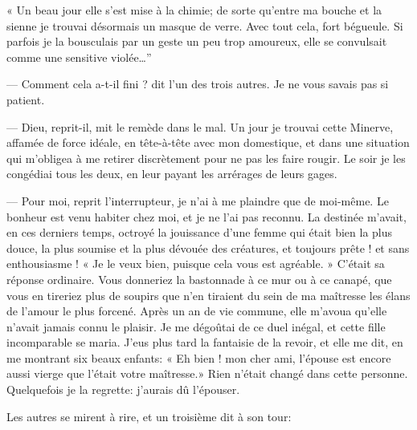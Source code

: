 « Un beau jour elle s’est mise à la chimie; de sorte
qu’entre ma bouche et la sienne je trouvai désormais
un masque de verre. Avec tout cela, fort bégueule. Si parfois je la
bousculais par un geste un peu trop amoureux, elle se convulsait comme
une sensitive violée\ldots''

--- Comment cela a{}-t{}-il fini ? dit l’un des trois
autres. Je ne vous savais pas si patient.

--- Dieu, reprit{}-il, mit le remède dans le mal. Un jour je trouvai cette
Minerve, affamée de force idéale, en tête{}-à{}-tête avec mon
domestique, et dans une situation qui m’obligea à me
retirer discrètement pour ne pas les faire rougir. Le soir je les
congédiai tous les deux, en leur payant les arrérages de leurs gages.

--- Pour moi, reprit l’interrupteur, je
n’ai à me plaindre que de moi{}-même. Le bonheur est
venu habiter chez moi, et je ne l’ai pas reconnu. La
destinée m’avait, en ces derniers temps, octroyé la
jouissance d’une femme qui était bien la plus douce,
la plus soumise et la plus dévouée des créatures, et toujours prête !
et sans enthousiasme ! « Je le veux bien, puisque cela vous est
agréable. » C’était sa réponse ordinaire. Vous
donneriez la bastonnade à ce mur ou à ce canapé, que vous en tireriez
plus de soupirs que n’en tiraient du sein de ma
maîtresse les élans de l’amour le plus forcené. Après
un an de vie commune, elle m’avoua
qu’elle n’avait jamais connu le
plaisir. Je me dégoûtai de ce duel inégal, et cette fille incomparable
se maria. J’eus plus tard la fantaisie de la revoir,
et elle me dit, en me montrant six beaux enfants: « Eh bien ! mon cher
ami, l’épouse est encore aussi vierge que
l’était votre maîtresse.» Rien
n’était changé dans cette personne. Quelquefois je la
regrette: j’aurais dû l’épouser.

Les autres se mirent à rire, et un troisième dit à son tour:

